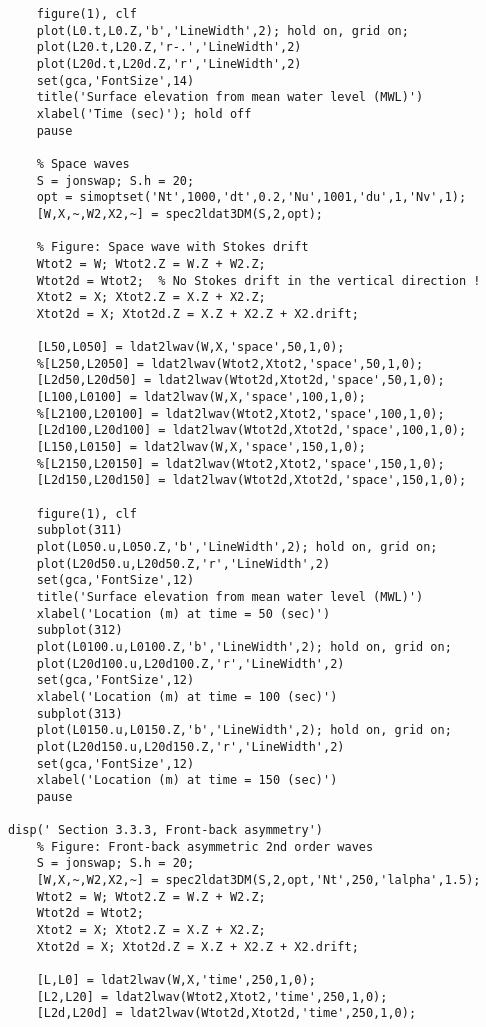 {\begin{verbatim}
    figure(1), clf
    plot(L0.t,L0.Z,'b','LineWidth',2); hold on, grid on;
    plot(L20.t,L20.Z,'r-.','LineWidth',2)
    plot(L20d.t,L20d.Z,'r','LineWidth',2)
    set(gca,'FontSize',14)
    title('Surface elevation from mean water level (MWL)')
    xlabel('Time (sec)'); hold off
    pause

    % Space waves
    S = jonswap; S.h = 20;
    opt = simoptset('Nt',1000,'dt',0.2,'Nu',1001,'du',1,'Nv',1);
    [W,X,~,W2,X2,~] = spec2ldat3DM(S,2,opt);
    
    % Figure: Space wave with Stokes drift
    Wtot2 = W; Wtot2.Z = W.Z + W2.Z;
    Wtot2d = Wtot2;  % No Stokes drift in the vertical direction ! 
    Xtot2 = X; Xtot2.Z = X.Z + X2.Z;
    Xtot2d = X; Xtot2d.Z = X.Z + X2.Z + X2.drift;

    [L50,L050] = ldat2lwav(W,X,'space',50,1,0);
    %[L250,L2050] = ldat2lwav(Wtot2,Xtot2,'space',50,1,0);
    [L2d50,L20d50] = ldat2lwav(Wtot2d,Xtot2d,'space',50,1,0);
    [L100,L0100] = ldat2lwav(W,X,'space',100,1,0);
    %[L2100,L20100] = ldat2lwav(Wtot2,Xtot2,'space',100,1,0);
    [L2d100,L20d100] = ldat2lwav(Wtot2d,Xtot2d,'space',100,1,0);
    [L150,L0150] = ldat2lwav(W,X,'space',150,1,0);
    %[L2150,L20150] = ldat2lwav(Wtot2,Xtot2,'space',150,1,0);
    [L2d150,L20d150] = ldat2lwav(Wtot2d,Xtot2d,'space',150,1,0);

    figure(1), clf
    subplot(311)
    plot(L050.u,L050.Z,'b','LineWidth',2); hold on, grid on;
    plot(L20d50.u,L20d50.Z,'r','LineWidth',2)
    set(gca,'FontSize',12)
    title('Surface elevation from mean water level (MWL)')
    xlabel('Location (m) at time = 50 (sec)')
    subplot(312)
    plot(L0100.u,L0100.Z,'b','LineWidth',2); hold on, grid on;
    plot(L20d100.u,L20d100.Z,'r','LineWidth',2)
    set(gca,'FontSize',12)
    xlabel('Location (m) at time = 100 (sec)')
    subplot(313)
    plot(L0150.u,L0150.Z,'b','LineWidth',2); hold on, grid on;
    plot(L20d150.u,L20d150.Z,'r','LineWidth',2)
    set(gca,'FontSize',12)
    xlabel('Location (m) at time = 150 (sec)')
    pause
       
disp(' Section 3.3.3, Front-back asymmetry')
    % Figure: Front-back asymmetric 2nd order waves
    S = jonswap; S.h = 20;   
    [W,X,~,W2,X2,~] = spec2ldat3DM(S,2,opt,'Nt',250,'lalpha',1.5);
    Wtot2 = W; Wtot2.Z = W.Z + W2.Z;
    Wtot2d = Wtot2;  
    Xtot2 = X; Xtot2.Z = X.Z + X2.Z;
    Xtot2d = X; Xtot2d.Z = X.Z + X2.Z + X2.drift;

    [L,L0] = ldat2lwav(W,X,'time',250,1,0);
    [L2,L20] = ldat2lwav(Wtot2,Xtot2,'time',250,1,0);
    [L2d,L20d] = ldat2lwav(Wtot2d,Xtot2d,'time',250,1,0);


\end{verbatim}}
